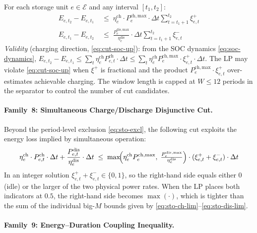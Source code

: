 For each storage unit $e \in \mathcal{E}$ and any interval $[t_1, t_2]$:
\begin{align}
  E_{e,t_2} - E_{e,t_1}
  &\;\leq\;
  \eta^{\mathrm{ch}}_e \cdot P^{\mathrm{ch,max}}_e \cdot \Delta t
  \sum_{t=t_1+1}^{t_2} \xi^{+}_{e,t}
  \label{eq:cut-soc-up}\\
  E_{e,t_1} - E_{e,t_2}
  &\;\leq\;
  \frac{P^{\mathrm{dis,max}}_e}{\eta^{\mathrm{dis}}_e} \cdot \Delta t
  \sum_{t=t_1+1}^{t_2} \xi^{-}_{e,t}
  \label{eq:cut-soc-dn}
\end{align}
\textit{Validity} (charging direction, \eqref{eq:cut-soc-up}):
from the SOC dynamics \eqref{eq:soc-dynamics},
$E_{e,t_2}-E_{e,t_1} \leq \sum_{t} \eta^{\mathrm{ch}}_e P^{\mathrm{ch}}_{e,t} \cdot\Delta t
\leq \sum_{t} \eta^{\mathrm{ch}}_e P^{\mathrm{ch,max}}_e \cdot \xi^{+}_{e,t} \cdot \Delta t$.
The LP may violate \eqref{eq:cut-soc-up} when $\xi^+$ is fractional and
the product $P^{\mathrm{ch,max}}_e \cdot \xi^+_{e,t}$ over-estimates achievable charging.
The window length is capped at $W \leq 12$ periods in the separator to
control the number of cut candidates.

\paragraph{Family~8: Simultaneous Charge/Discharge Disjunctive Cut.}

Beyond the period-level exclusion \eqref{eq:sto-excl}, the following cut
exploits the energy loss implied by simultaneous operation:
\begin{equation}\label{eq:cut-cd-disj}
  \eta^{\mathrm{ch}}_e \cdot P^{\mathrm{ch}}_{e,t} \cdot \Delta t
  +
  \frac{P^{\mathrm{dis}}_{e,t}}{\eta^{\mathrm{dis}}_e} \cdot \Delta t
  \;\leq\;
  \max\!\Bigl(\eta^{\mathrm{ch}}_e P^{\mathrm{ch,max}}_e,\;
              \tfrac{P^{\mathrm{dis,max}}_e}{\eta^{\mathrm{dis}}_e}\Bigr)
  \cdot (\xi^{+}_{e,t} + \xi^{-}_{e,t}) \cdot \Delta t
\end{equation}
In an integer solution $\xi^+_{e,t}+\xi^-_{e,t} \in \{0,1\}$, so the right-hand
side equals either 0 (idle) or the larger of the two physical power rates.
When the LP places both indicators at $0.5$, the right-hand side becomes
$\max(\cdot)$, which is tighter than the sum of the individual big-$M$
bounds given by \eqref{eq:sto-ch-lim}--\eqref{eq:sto-dis-lim}.

\paragraph{Family~9: Energy--Duration Coupling Inequality.}

